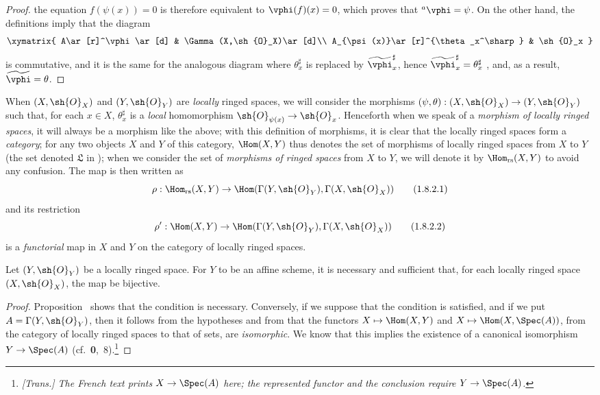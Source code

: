 \begin{proof}
the equation $f(\psi(x))=0$ is therefore equivalent to $\vphi(f)(x)=0$, which proves that ${}^a\vphi=\psi$.
On the other hand, the definitions imply that the diagram
\[
  \xymatrix{
    A\ar[r]^\vphi\ar[d] &
    \Gamma(X,\sh{O}_X)\ar[d]\\
    A_{\psi(x)}\ar[r]^{\theta_x^\sharp} &
    \sh{O}_x
  }
\]
is commutative, and it is the same for the analogous diagram where $\theta_x^\sharp$ is replaced by $\widetilde{\vphi}_x^\sharp$, hence $\widetilde{\vphi}_x^\sharp=\theta_x^\sharp$ , and, as a result, $\widetilde{\vphi}=\theta$.
\end{proof}

\begin{env}[1.8.2]
\label{I.1.8.2}
When $(X,\sh{O}_X)$ and $(Y,\sh{O}_Y)$ are \emph{locally} ringed spaces, we will consider the morphisms $(\psi,\theta):(X,\sh{O}_X)\to(Y,\sh{O}_Y)$ such that, for each $x\in X$, $\theta_x^\sharp$ is a \emph{local} homomorphism $\sh{O}_{\psi(x)}\to\sh{O}_x$.
Henceforth when we speak
of a \emph{morphism of locally ringed spaces}, it will always be a morphism like the above;
with this definition of morphisms, it is clear that the locally ringed spaces form a \emph{category};
for any two objects $X$ and $Y$ of this category, $\Hom(X,Y)$ thus denotes the set of morphisms of locally ringed spaces from $X$ to $Y$ (the set denoted $\mathfrak{L}$ in );
when we consider the set of \emph{morphisms of ringed spaces} from $X$ to $Y$, we will denote it by $\Hom_\text{rs}(X,Y)$ to avoid any confusion.
The map  is then written as
\[
  \label{I.1.8.2.1}
  \rho:\Hom_\text{rs}(X,Y)\to\Hom(\Gamma(Y,\sh{O}_Y),\Gamma(X,\sh{O}_X))
  \tag{1.8.2.1}
\]
and its restriction
\[
  \label{I.1.8.2.2}
  \rho':\Hom(X,Y)\to\Hom(\Gamma(Y,\sh{O}_Y),\Gamma(X,\sh{O}_X))
  \tag{1.8.2.2}
\]
is a \emph{functorial} map in $X$ and $Y$ on the category of locally ringed spaces.
\end{env}

\begin{corollary}[1.8.3]
\label{I.1.8.3}
Let $(Y,\sh{O}_Y)$ be a locally ringed space.
For $Y$ to be an affine scheme, it is necessary and sufficient that, for each locally ringed space $(X,\sh{O}_X)$, the map  be bijective.
\end{corollary}

\begin{proof}
Proposition~ shows that the condition is necessary.
Conversely, if we suppose that the condition is satisfied, and if we put $A=\Gamma(Y,\sh{O}_Y)$, then it follows from the hypotheses and from  that the functors $X\mapsto\Hom(X,Y)$ and $X\mapsto\Hom(X,\Spec(A))$, from the category of locally ringed spaces to that of sets, are \emph{isomorphic}.
We know that this implies the existence of a canonical isomorphism $Y\to\Spec(A)$ (cf.~\textbf{0},~8).\footnote{\emph{[Trans.] The French text prints $X\to\Spec(A)$ here; the represented functor and the conclusion require $Y\to\Spec(A)$.}}
\end{proof}

